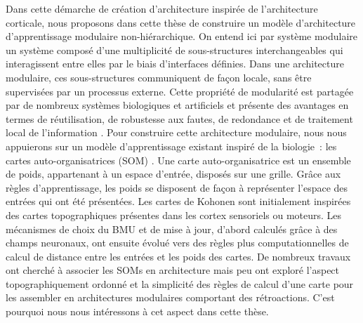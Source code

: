 Dans cette démarche de création d'architecture inspirée de l'architecture corticale, nous proposons dans cette thèse de construire un modèle d'architecture d'apprentissage modulaire non-hiérarchique.
On entend ici par système modulaire un système composé d'une multiplicité de sous-structures interchangeables qui interagissent entre elles par le biais d'interfaces définies. 
Dans une architecture modulaire, ces sous-structures communiquent de façon locale, sans être supervisées par un processus externe. Cette propriété de modularité est partagée par de nombreux systèmes biologiques et artificiels et présente des avantages en termes de réutilisation, de robustesse aux fautes, de redondance et de traitement local de l'information \cite{clune_evolutionary_2013}.
Pour construire cette architecture modulaire, nous nous appuierons sur un modèle d'apprentissage existant inspiré de la biologie~: les cartes auto-organisatrices (SOM) \cite{Kohonen1982}.
Une carte auto-organisatrice est un ensemble de poids, appartenant à un espace d'entrée, disposés sur une grille. Grâce aux règles d'apprentissage, les poids se disposent de façon à représenter l'espace des entrées qui ont été présentées.
Les cartes de Kohonen sont initialement inspirées des cartes topographiques présentes dans les cortex sensoriels ou moteurs. Les mécanismes de choix du BMU et de mise à jour, d'abord calculés grâce à des champs neuronaux, ont ensuite évolué vers des règles plus computationnelles de calcul de distance entre les entrées et les poids des cartes.
De nombreux travaux ont cherché à associer les SOMs en architecture mais peu ont exploré l'aspect topographiquement ordonné et la simplicité des règles de calcul d'une carte pour les assembler en architectures modulaires comportant des rétroactions. C'est pourquoi nous nous intéressons à cet aspect dans cette thèse.

